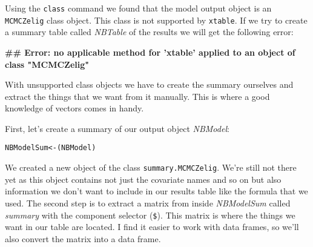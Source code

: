 Using the {\tt{class}} command we found that the model output object is an {\tt{MCMCZelig}} class object. This class is not supported by {\tt{xtable}}. If we try to create a summary table called {\emph{NBTable}} of the results we will get the following error:

\begin{knitrout}
\color{fgcolor}\begin{kframe}


{\ttfamily\noindent\bfseries\textcolor{errorcolor}{\#\# Error: no applicable method for 'xtable' applied to an object of class "MCMCZelig"}}\end{kframe}
\end{knitrout}


With unsupported class objects we have to create the summary ourselves and extract the things that we want from it manually. This is where a good knowledge of vectors comes in handy. 

First, let's create a summary of our output object {\emph{NBModel}}:

\begin{knitrout}
\color{fgcolor}\begin{kframe}
\begin{alltt}
NBModelSum <- (NBModel)
\end{alltt}
\end{kframe}
\end{knitrout}


We created a new object of the class {\tt{summary.MCMCZelig}}. We're still not there yet as this object contains not just the covariate names and so on but also information we don't want to include in our results table like the formula that we used. The second step is to extract a matrix from inside {\emph{NBModelSum}} called {\emph{summary}} with the component selector ({\tt{\$}}). This matrix is where the things we want in our table are located. I find it easier to work with data frames, so we'll also convert the matrix into a data frame.

\begin{knitrout}
\color{fgcolor}
\end{knitrout}

